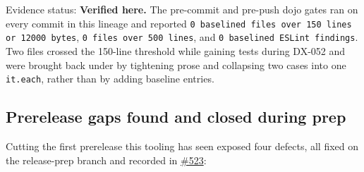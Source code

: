 \begin{itemize}
  Evidence status: \textbf{Verified here.} The pre-commit and pre-push dojo gates ran on every commit in this lineage and reported \texttt{0\allowbreak{} \allowbreak{}b\allowbreak{}a\allowbreak{}s\allowbreak{}e\allowbreak{}l\allowbreak{}i\allowbreak{}n\allowbreak{}e\allowbreak{}d\allowbreak{} \allowbreak{}f\allowbreak{}i\allowbreak{}l\allowbreak{}e\allowbreak{}s\allowbreak{} \allowbreak{}o\allowbreak{}v\allowbreak{}e\allowbreak{}r\allowbreak{} \allowbreak{}1\allowbreak{}5\allowbreak{}0\allowbreak{} \allowbreak{}l\allowbreak{}i\allowbreak{}n\allowbreak{}e\allowbreak{}s\allowbreak{} \allowbreak{}o\allowbreak{}r\allowbreak{} \allowbreak{}1\allowbreak{}2\allowbreak{}0\allowbreak{}0\allowbreak{}0\allowbreak{} \allowbreak{}b\allowbreak{}y\allowbreak{}t\allowbreak{}e\allowbreak{}s}, \texttt{0\allowbreak{} \allowbreak{}f\allowbreak{}i\allowbreak{}l\allowbreak{}e\allowbreak{}s\allowbreak{} \allowbreak{}o\allowbreak{}v\allowbreak{}e\allowbreak{}r\allowbreak{} \allowbreak{}5\allowbreak{}0\allowbreak{}0\allowbreak{} \allowbreak{}l\allowbreak{}i\allowbreak{}n\allowbreak{}e\allowbreak{}s}, and \texttt{0\allowbreak{} \allowbreak{}b\allowbreak{}a\allowbreak{}s\allowbreak{}e\allowbreak{}l\allowbreak{}i\allowbreak{}n\allowbreak{}e\allowbreak{}d\allowbreak{} \allowbreak{}E\allowbreak{}S\allowbreak{}L\allowbreak{}i\allowbreak{}n\allowbreak{}t\allowbreak{} \allowbreak{}f\allowbreak{}i\allowbreak{}n\allowbreak{}d\allowbreak{}i\allowbreak{}n\allowbreak{}g\allowbreak{}s}. Two files crossed the 150-line threshold while gaining tests during DX-052 and were brought back under by tightening prose and collapsing two cases into one \texttt{i\allowbreak{}t\allowbreak{}.\allowbreak{}e\allowbreak{}a\allowbreak{}c\allowbreak{}h}, rather than by adding baseline entries.
\end{itemize}

\subsection{Prerelease gaps found and closed during prep}\label{record-262-prerelease-gaps-found-and-closed-during-prep}

Cutting the first prerelease this tooling has seen exposed four defects, all fixed on the release-prep branch and recorded in \href{https://github.com/flyingrobots/bijou/issues/523}{\#523}:

